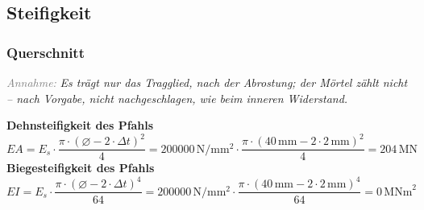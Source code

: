 \documentclass[11pt,a4paper]{article}
\newcommand{\hinweis}[2]{\par\noindent\textcolor{gray}{\textit{#1:}} \textit{#2}\par}
\begin{document}
\subsection{Steifigkeit}
\subsubsection{Querschnitt}
\hinweis{Annahme}{Es trägt nur das Tragglied, nach der Abrostung; der Mörtel zählt nicht -- nach Vorgabe, nicht nachgeschlagen, wie beim inneren Widerstand.}
\noindent\textbf{Dehnsteifigkeit des Pfahls}
\begin{equation*}
EA = E_s \cdot \frac{\pi \cdot \left(\varnothing - 2 \cdot \Delta t\right)^{2}}{4} = 200000\,\mathrm{N}/\mathrm{mm}^{2} \cdot \frac{\pi \cdot \left(40\,\mathrm{mm} - 2 \cdot 2\,\mathrm{mm}\right)^{2}}{4} = 204\,\mathrm{MN}
\end{equation*}
\noindent\textbf{Biegesteifigkeit des Pfahls}
\begin{equation*}
EI = E_s \cdot \frac{\pi \cdot \left(\varnothing - 2 \cdot \Delta t\right)^{4}}{64} = 200000\,\mathrm{N}/\mathrm{mm}^{2} \cdot \frac{\pi \cdot \left(40\,\mathrm{mm} - 2 \cdot 2\,\mathrm{mm}\right)^{4}}{64} = 0\,\mathrm{MNm}^{2}
\end{equation*}
\end{document}
